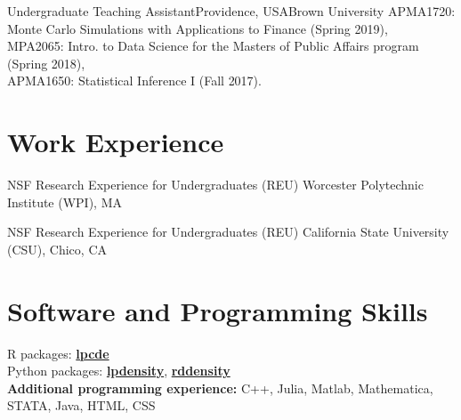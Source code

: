 \documentclass[10pt,a4paper,roman]{moderncv}        %
\begin{document}
{Undergraduate Teaching Assistant}{Providence, USA}{Brown University}
{APMA1720: Monte Carlo Simulations with Applications to Finance (Spring 2019), \\
  MPA2065: Intro. to Data Science for the Masters of Public Affairs program (Spring 2018),
  \\
  APMA1650: Statistical Inference I (Fall 2017).
}

\vspace{-0.3cm}
\section{Work Experience}
{NSF Research Experience for Undergraduates (REU) }
{Worcester Polytechnic Institute (WPI), MA}
{} {
}

{NSF Research Experience for Undergraduates (REU)}
{California State University (CSU), Chico, CA}
{}
{}

\vspace{-0.3cm}
\section{Software and Programming Skills}
R packages:
\color{blue}\href{https://nppackages.github.io/lpcde/}{\textbf{lpcde}}\color{black}
\\
Python packages: \color{blue}\href{https://nppackages.github.io/lpdensity_doc/}
{\textbf{lpdensity}}\color{black},
\color{blue}\href{https://rdpackages.github.io/rddensity_doc/}
{\textbf{rddensity}}\color{black}
\\
\textbf{Additional programming experience:}
C++, Julia, Matlab, Mathematica, STATA, Java, HTML, CSS
\end{document}
